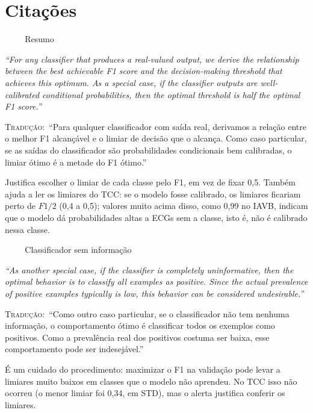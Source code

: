 \documentclass[11pt,a4paper]{article}
\newcommand{\pagechip}[1]{{\setlength{\fboxsep}{1.5pt}\colorbox{cAcc}{\textcolor{white}{\scriptsize\texttt{#1}}}}}
\newenvironment{origquote}{\par\itshape\small}{\par}
\newenvironment{tradquote}{\par\small\textsc{Tradução:}\ }{\par}
\newcommand{\explab}[1]{\par\smallskip{\small\color{cAcc}\textbf{\MakeUppercase{#1}}}\par}
\begin{document}
\section{Citações}

\begin{citacard}{\pagechip{p. 1} Resumo}
\begin{origquote}“For any classifier that produces a real-valued output, we derive the relationship between the best achievable F1 score and the decision-making threshold that achieves this optimum. As a special case, if the classifier outputs are well-calibrated conditional probabilities, then the optimal threshold is half the optimal F1 score.”\end{origquote}
\begin{tradquote}“Para qualquer classificador com saída real, derivamos a relação entre o melhor F1 alcançável e o limiar de decisão que o alcança. Como caso particular, se as saídas do classificador são probabilidades condicionais bem calibradas, o limiar ótimo é a metade do F1 ótimo.”\end{tradquote}
\explab{Explicação}
Justifica escolher o limiar de cada classe pelo F1, em vez de fixar 0,5. Também ajuda a ler os limiares do TCC: se o modelo fosse calibrado, os limiares ficariam perto de $F1/2$ (0,4 a 0,5); valores muito acima disso, como 0,99 no IAVB, indicam que o modelo dá probabilidades altas a ECGs sem a classe, isto é, não é calibrado nessa classe.
\end{citacard}

\begin{citacard}{\pagechip{p. 1} Classificador sem informação}
\begin{origquote}“As another special case, if the classifier is completely uninformative, then the optimal behavior is to classify all examples as positive. Since the actual prevalence of positive examples typically is low, this behavior can be considered undesirable.”\end{origquote}
\begin{tradquote}“Como outro caso particular, se o classificador não tem nenhuma informação, o comportamento ótimo é classificar todos os exemplos como positivos. Como a prevalência real dos positivos costuma ser baixa, esse comportamento pode ser indesejável.”\end{tradquote}
\explab{Explicação}
É um cuidado do procedimento: maximizar o F1 na validação pode levar a limiares muito baixos em classes que o modelo não aprendeu. No TCC isso não ocorreu (o menor limiar foi 0,34, em STD), mas o alerta justifica conferir os limiares.
\end{citacard}
\end{document}
